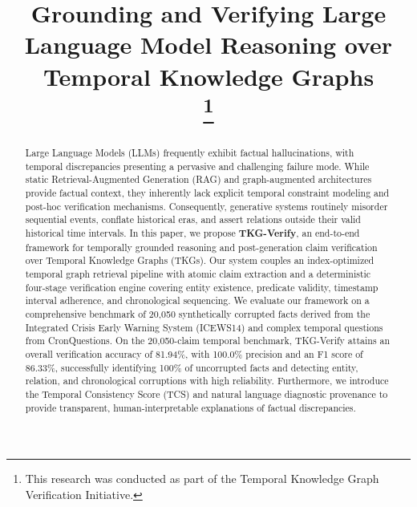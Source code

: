 \documentclass[conference]{IEEEtran}
\begin{document}
\title{Grounding and Verifying Large Language Model Reasoning over Temporal Knowledge Graphs\\
\thanks{This research was conducted as part of the Temporal Knowledge Graph Verification Initiative.}
}

\author{
\and
{}
}

\maketitle

\begin{abstract}
Large Language Models (LLMs) frequently exhibit factual hallucinations, with temporal discrepancies presenting a pervasive and challenging failure mode. While static Retrieval-Augmented Generation (RAG) and graph-augmented architectures provide factual context, they inherently lack explicit temporal constraint modeling and post-hoc verification mechanisms. Consequently, generative systems routinely misorder sequential events, conflate historical eras, and assert relations outside their valid historical time intervals. In this paper, we propose \textbf{TKG-Verify}, an end-to-end framework for temporally grounded reasoning and post-generation claim verification over Temporal Knowledge Graphs (TKGs). Our system couples an index-optimized temporal graph retrieval pipeline with atomic claim extraction and a deterministic four-stage verification engine covering entity existence, predicate validity, timestamp interval adherence, and chronological sequencing. We evaluate our framework on a comprehensive benchmark of 20,050 synthetically corrupted facts derived from the Integrated Crisis Early Warning System (ICEWS14) and complex temporal questions from CronQuestions. On the 20,050-claim temporal benchmark, TKG-Verify attains an overall verification accuracy of 81.94\%, with 100.0\% precision and an F1 score of 86.33\%, successfully identifying 100\% of uncorrupted facts and detecting entity, relation, and chronological corruptions with high reliability. Furthermore, we introduce the Temporal Consistency Score (TCS) and natural language diagnostic provenance to provide transparent, human-interpretable explanations of factual discrepancies.
\end{abstract}
\end{document}
